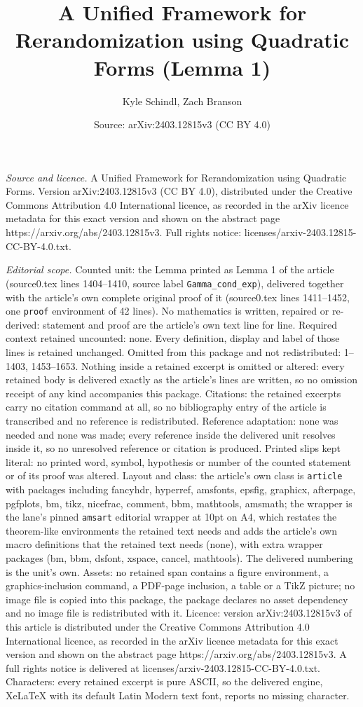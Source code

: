 \documentclass[10pt,a4paper]{amsart}
\title[A Unified Framework for Rerandomization using Quadratic Form]{A Unified Framework for Rerandomization using Quadratic Forms (Lemma 1)}
\author{Kyle Schindl, Zach Branson}
\date{Source: arXiv:2403.12815v3 (CC BY 4.0)}
\begin{document}
\maketitle

\noindent\emph{Source and licence.} A Unified Framework for Rerandomization using Quadratic Forms. Version arXiv:2403.12815v3 (CC BY 4.0), distributed under the Creative Commons Attribution 4.0 International licence, as recorded in the arXiv licence metadata for this exact version and shown on the abstract page https://arxiv.org/abs/2403.12815v3. Full rights notice: licenses/arxiv-2403.12815-CC-BY-4.0.txt.\par\smallskip

\noindent\textit{Editorial scope.} Counted unit: the Lemma printed as Lemma 1 of the article (source0.tex lines 1404--1410, source label \texttt{Gamma\_cond\_exp}), delivered together with the article's own complete original proof of it (source0.tex lines 1411--1452, one \texttt{proof} environment of 42 lines). No mathematics is written, repaired or re-derived: statement and proof are the article's own text line for line. Required context retained uncounted: none. Every definition, display and label of those lines is retained unchanged. Omitted from this package and not redistributed: 1--1403, 1453--1653. Nothing inside a retained excerpt is omitted or altered: every retained body is delivered exactly as the article's lines are written, so no omission receipt of any kind accompanies this package. Citations: the retained excerpts carry no citation command at all, so no bibliography entry of the article is transcribed and no reference is redistributed. Reference adaptation: none was needed and none was made; every reference inside the delivered unit resolves inside it, so no unresolved reference or citation is produced. Printed slips kept literal: no printed word, symbol, hypothesis or number of the counted statement or of its proof was altered. Layout and class: the article's own class is \texttt{article} with packages including fancyhdr, hyperref, amsfonts, epsfig, graphicx, afterpage, pgfplots, bm, tikz, nicefrac, comment, bbm, mathtools, amsmath; the wrapper is the lane's pinned \texttt{amsart} editorial wrapper at 10pt on A4, which restates the theorem-like environments the retained text needs and adds the article's own macro definitions that the retained text needs (none), with extra wrapper packages (bm, bbm, dsfont, xspace, cancel, mathtools). The delivered numbering is the unit's own. Assets: no retained span contains a figure environment, a graphics-inclusion command, a PDF-page inclusion, a table or a TikZ picture; no image file is copied into this package, the package declares no asset dependency and no image file is redistributed with it. Licence: version arXiv:2403.12815v3 of this article is distributed under the Creative Commons Attribution 4.0 International licence, as recorded in the arXiv licence metadata for this exact version and shown on the abstract page https://arxiv.org/abs/2403.12815v3. A full rights notice is delivered at licenses/arxiv-2403.12815-CC-BY-4.0.txt. Characters: every retained excerpt is pure ASCII, so the delivered engine, XeLaTeX with its default Latin Modern text font, reports no missing character.
\end{document}
